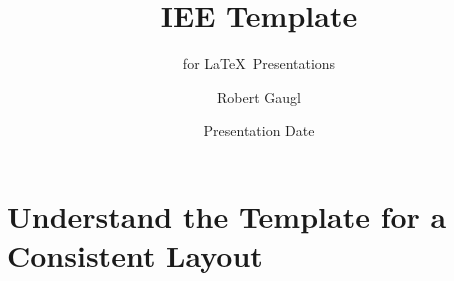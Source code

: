 \documentclass[aspectratio=169]{beamer}
\title[Short Title]{IEE Template}
\subtitle{for \LaTeX~Presentations}
\author{Robert Gaugl}
\date{Presentation Date}
\institute{Institute of Electricity Economics and Energy Innovation/TU Graz}
\begin{document}
\begin{frame}[plain]
    \maketitleslide
\end{frame}


\section{Understand the \textbf{Template} for a Consistent Layout}

\begin{frame}
    \agenda
\end{frame}
\end{document}
